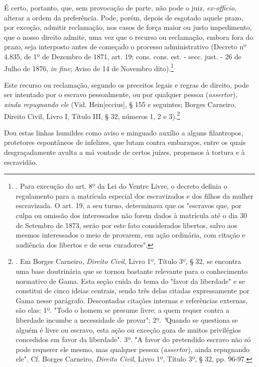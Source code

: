É certo, portanto, que, sem provocação de parte, não pode o juiz,
\emph{ex-officio}, alterar a ordem da preferência. Pode, porém, depois
de esgotado aquele prazo, por exceção, admitir reclamação, nos casos de
força maior ou justo impedimento, que o nosso direito admite, uma vez
que o recurso ou reclamação, embora fora do prazo, seja interposto antes
de começado o processo administrativo (Decreto nº 4.835, de 1º de
Dezembro de 1871, art. 19; cons. cons. est. - secc. just. - 26 de Julho
de 1876, \emph{in fine}; Aviso de 14 de Novembro dito).\footnote{. Para
  execução do art. 8º da Lei do Ventre Livre, o decreto definia o
  regulamento para a matrícula especial dos escravizados e dos filhos da
  mulher escravizada. O art. 19, a seu turno, determinava que os
  "escravos que, por culpa ou omissão dos interessados não forem dados à
  matrícula até o dia 30 de Setembro de 1873, serão por este fato
  considerados libertos, salvo aos mesmos interessados o meio de
  provarem, em ação ordinária, com citação e audiência dos libertos e de
  seus curadores".}

Este recurso ou reclamação, segundo os preceitos legais e regras de
direito, pode ser intentado por o escravo pessoalmente, ou por qualquer
pessoa (\emph{assertor}), \emph{ainda repugnando ele} (Vid.
Hein{[}eccius{]}, § 155 e seguintes; Borges Carneiro, Direito Civil,
Livro I, Título III, § 32, números 1, 2 e 3).\footnote{. Em Borges
  Carneiro, \emph{Direito Civil}, Livro 1º, Título 3º, § 32, se encontra
  uma base doutrinária que se tornou bastante relevante para o
  conhecimento normativo de Gama. Esta seção cuida do tema do "favor da
  liberdade" e se constitui de cinco ideias centrais, sendo três delas
  citadas expressamente por Gama nesse parágrafo. Descontadas citações
  internas e referências externas, são elas: 1º. "Todo o homem se
  presume livre; a quem requer contra a liberdade incumbe a necessidade
  de provar"; 2º. \emph{"}Quando se questiona se alguém é livre ou
  escravo, esta ação ou exceção goza de muitos privilégios concedidos em
  favor da liberdade". 3º. "A favor do pretendido escravo não só pode
  requerer ele mesmo, mas qualquer pessoa (\emph{assertor}), ainda
  repugnando ele". Cf. Borges Carneiro, \emph{Direito Civil}, Livro 1º,
  Título 3º, § 32, pp. 96-97.}

Dou estas linhas humildes
como aviso e minguado auxílio a alguns filantropos, protetores
espontâneos de infelizes, que lutam contra embaraços, entre os quais
desgraçadamente avulta a má vontade de certos juízes, propensos à
tortura e à escravidão.

